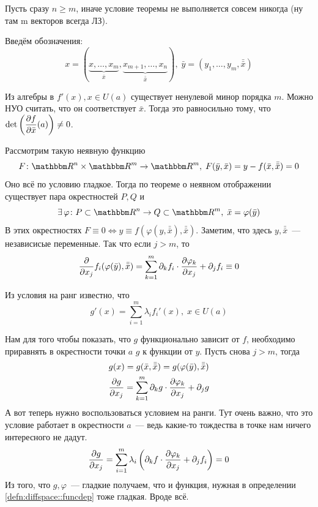 \documentclass[12pt,trimbord]{../../../notes}
\begin{document}
\begin{ittproof}
  Пусть сразу $n \geqslant m$, иначе условие теоремы не выполняется совсем никогда (ну там m
  векторов всегда ЛЗ).

  Введём обозначения:
  \[
    x = (\underbrace{x, \dotsc, x_m}_{\bar{x}}, \underbrace{x_{m+1}, \dotsc,
    x_n}_{\bar{\bar{x}}}), \; \bar y = (y_1, \dotsc, y_m, \bar{\bar x})
  \]

  Из алгебры в $f'(x), x\in U(a)$ существует ненулевой минор порядка $m$. Можно НУО считать, что он
  соответствует $\bar x$. Тогда это равносильно тому, что $\displaystyle \det \left(\frac{\partial f}{\partial \bar
  x}(a)\right) \neq 0$.

  Рассмотрим такую неявную функцию 
  \[
    F \colon \R^n \times \R^m \to \R^m, \; F(\bar{y}, \bar{x}) = y - f(\bar{x}, \bar{\bar x}) = 0 
  \]
  Оно всё по условию гладкое.
  Тогда по теореме о неявном отображении существует пара окрестностей $P, Q$ и 
  \[
    \exists\,\varphi \colon P\subset \R^n \to Q\subset \R^m, \;  \bar x = \varphi(\bar y)
  \] 
  В этих окрестностях $F\equiv 0 \Leftrightarrow y \equiv f(\varphi(y, \bar{\bar x}), \bar{\bar x})$.
  Заметим, что здесь $y, \bar{\bar x}$~--- независисые переменные. Так что если $j > m$, то
  \[
    \frac{\partial }{\partial x_j} f_i(\varphi(\bar y), \bar{\bar x}) = \sum_{k=1}^m \partial_k{f_i} \cdot
    \frac{\partial \varphi_k}{\partial x_j} + \partial_j f_i \equiv 0
  \]

  Из условия на ранг известно, что 
  \[
    g'(x) = \sum_{i=1}^m \lambda_i f_i'(x), \; x\in U(a)
  \]

  Нам для того чтобы показать, что $g$ функционально зависит от $f$, необходимо приравнять в
  окрестности точки $a$ $g$ к функции от $y$. Пусть снова $j>m$, тогда 
  \begin{align*}
    & g(x) = g(\bar x, \bar{\bar x}) = g(\varphi(\bar y), \bar{\bar x}) \\
    &\frac{\partial g}{\partial x_j}  = \sum_{k=1}^m \partial_k g \cdot \frac{\partial \varphi_k}{\partial x_j} + \partial_j g 
  \end{align*}
  А вот теперь нужно воспользоваться условием на ранги. Тут очень важно, что это условие работает
  в окрестности $a$~--- ведь какие-то тождества в точке нам ничего интересного не дадут.
  \[
    \frac{\partial g}{\partial x_j}  = \sum_{i=1}^m \lambda_i \left(\partial_k f 
    \cdot \frac{\partial \varphi_k}{\partial x_j} + \partial_j f_i\right) = 0 
  \]
  Из того, что $g, \varphi$~--- гладкие получаем, что и функция, нужная в определении
  \ref{defn:diffspace::funcdep} тоже гладкая. Вроде всё.
\end{ittproof}
\end{document}
